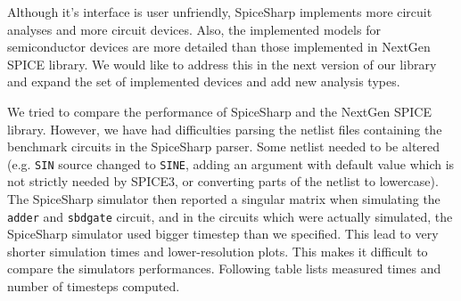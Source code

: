 Although it's interface is user unfriendly, SpiceSharp implements more circuit analyses and more circuit devices. Also, the implemented models for semiconductor devices are more detailed than those implemented in NextGen SPICE library. We would like to address this in the next version of our library and expand the set of implemented devices and add new analysis types.

We tried to compare the performance of SpiceSharp and the NextGen SPICE library. However, we have had difficulties parsing the netlist files containing the benchmark circuits in the SpiceSharp parser. Some netlist needed to be altered (e.g. \texttt{SIN} source changed to \texttt{SINE}, adding an argument with default value which is not strictly needed by SPICE3, or converting parts of the netlist to lowercase). The SpiceSharp simulator then reported a singular matrix when simulating the \texttt{adder} and \texttt{sbdgate} circuit, and in the circuits which were actually simulated, the SpiceSharp simulator used bigger timestep than we specified. This lead to very shorter simulation times and lower-resolution plots. This makes it difficult to compare the simulators performances. Following table lists measured times and number of timesteps computed.

